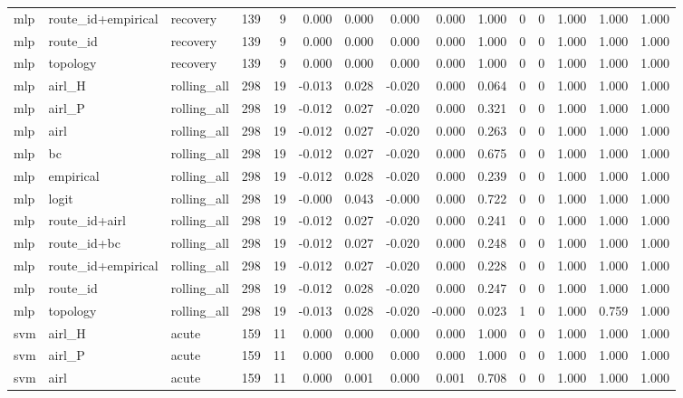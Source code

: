 \begin{tabular}{lllrrrrrrrrrrrr}
mlp & route_id+empirical & recovery & 139 & 9 & 0.000 & 0.000 & 0.000 & 0.000 & 1.000 & 0 & 0 & 1.000 & 1.000 & 1.000 \\
mlp & route_id & recovery & 139 & 9 & 0.000 & 0.000 & 0.000 & 0.000 & 1.000 & 0 & 0 & 1.000 & 1.000 & 1.000 \\
mlp & topology & recovery & 139 & 9 & 0.000 & 0.000 & 0.000 & 0.000 & 1.000 & 0 & 0 & 1.000 & 1.000 & 1.000 \\
mlp & airl_H & rolling_all & 298 & 19 & -0.013 & 0.028 & -0.020 & 0.000 & 0.064 & 0 & 0 & 1.000 & 1.000 & 1.000 \\
mlp & airl_P & rolling_all & 298 & 19 & -0.012 & 0.027 & -0.020 & 0.000 & 0.321 & 0 & 0 & 1.000 & 1.000 & 1.000 \\
mlp & airl & rolling_all & 298 & 19 & -0.012 & 0.027 & -0.020 & 0.000 & 0.263 & 0 & 0 & 1.000 & 1.000 & 1.000 \\
mlp & bc & rolling_all & 298 & 19 & -0.012 & 0.027 & -0.020 & 0.000 & 0.675 & 0 & 0 & 1.000 & 1.000 & 1.000 \\
mlp & empirical & rolling_all & 298 & 19 & -0.012 & 0.028 & -0.020 & 0.000 & 0.239 & 0 & 0 & 1.000 & 1.000 & 1.000 \\
mlp & logit & rolling_all & 298 & 19 & -0.000 & 0.043 & -0.000 & 0.000 & 0.722 & 0 & 0 & 1.000 & 1.000 & 1.000 \\
mlp & route_id+airl & rolling_all & 298 & 19 & -0.012 & 0.027 & -0.020 & 0.000 & 0.241 & 0 & 0 & 1.000 & 1.000 & 1.000 \\
mlp & route_id+bc & rolling_all & 298 & 19 & -0.012 & 0.027 & -0.020 & 0.000 & 0.248 & 0 & 0 & 1.000 & 1.000 & 1.000 \\
mlp & route_id+empirical & rolling_all & 298 & 19 & -0.012 & 0.027 & -0.020 & 0.000 & 0.228 & 0 & 0 & 1.000 & 1.000 & 1.000 \\
mlp & route_id & rolling_all & 298 & 19 & -0.012 & 0.028 & -0.020 & 0.000 & 0.247 & 0 & 0 & 1.000 & 1.000 & 1.000 \\
mlp & topology & rolling_all & 298 & 19 & -0.013 & 0.028 & -0.020 & -0.000 & 0.023 & 1 & 0 & 1.000 & 0.759 & 1.000 \\
svm & airl_H & acute & 159 & 11 & 0.000 & 0.000 & 0.000 & 0.000 & 1.000 & 0 & 0 & 1.000 & 1.000 & 1.000 \\
svm & airl_P & acute & 159 & 11 & 0.000 & 0.000 & 0.000 & 0.000 & 1.000 & 0 & 0 & 1.000 & 1.000 & 1.000 \\
svm & airl & acute & 159 & 11 & 0.000 & 0.001 & 0.000 & 0.001 & 0.708 & 0 & 0 & 1.000 & 1.000 & 1.000 \\

\end{tabular}
